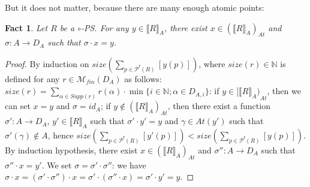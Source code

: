\documentclass{article}
\theoremstyle{plain}
\newtheorem{fact}[theorem]{Fact}
\newcommand{\Nat}{\ensuremath{\mathbb{N}}}
\newcommand{\atoms}[1]{\textit{At}(#1)}
\newcommand{\size}[1]{\textit{size}(#1)}
\newcommand{\finitemultisets}[1]{\mathcal{M}_\textit{fin}(#1)}
\newcommand{\conclusions}[1]{\mathcal{P}^{\textsf{f}}(#1)}
\newcommand{\sm}[1]{\llbracket #1 \rrbracket}
\newcommand{\supp}[1]{\textit{Supp}(#1)}
\begin{document}
But it does not matter, because there are many enough atomic points:

\begin{fact}\label{fact: atomic are enough}
Let $R$ be a $\circ$-PS. For any $y \in \sm{R}_A$, there exist $x \in {(\sm{R}_A)}_\textit{At}$ and $\sigma : A \to D_A$ such that $\sigma \cdot x = y$. \end{fact}

\begin{proof}
By induction on $\size{\sum_{p \in \conclusions{R}} [y(p)]}$, where $\size{r} \in \Nat$ is defined for any $r \in \finitemultisets{D_A}$ as follows: $\size{r} = \sum_{\alpha \in \supp{r}} r(\alpha) \cdot \min \{ i \in \Nat ; \alpha \in D_{A, i} \}$: if $y \in {[\sm{R}_A)}_\textit{At}$, then we can set $x = y$ and $\sigma = id_A$; if $y \notin {(\sm{R}_A)}_{\textit{At}}$, then there exist a function $\sigma' : A \to D_A$, $y' \in \sm{R}_A$ such that $\sigma' \cdot y' = y$ and $\gamma \in \atoms{y'}$ such that $\sigma'(\gamma) \notin A$, hence $\size{\sum_{p \in \conclusions{R}} [y'(p)]} < \size{\sum_{p \in \conclusions{R}} [y(p)]}$. By induction hypothesis, there exist $x \in {(\sm{R}_A)}_\textit{At}$ and $\sigma'' : A \to D_A$ such that $\sigma'' \cdot x = y'$. We set $\sigma = \sigma' \cdot \sigma''$: we have $\sigma \cdot x = (\sigma' \cdot \sigma'') \cdot x = \sigma' \cdot (\sigma'' \cdot x) = \sigma' \cdot y' = y$.
\end{proof}
\end{document}
